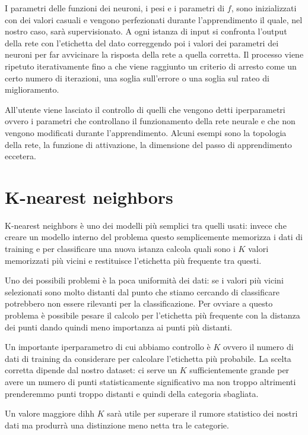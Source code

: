 \documentclass[a4paper,12pt]{report}
\begin{document}
I parametri delle funzioni dei neuroni, i pesi e i parametri di $f$, sono
inizializzati con dei valori casuali e vengono perfezionati durante
l'apprendimento il quale, nel nostro caso, sarà supervisionato. A ogni istanza
di input si confronta l'output della rete con l'etichetta del dato correggendo
poi i valori dei parametri dei neuroni per far avvicinare la risposta della rete
a quella corretta. Il processo viene ripetuto iterativamente fino a che viene
raggiunto un criterio di arresto come un certo numero di iterazioni, una soglia
sull'errore o una soglia sul rateo di miglioramento. 

All'utente viene lasciato il controllo di quelli che vengono detti iperparametri
ovvero i parametri che controllano il funzionamento della rete neurale e che non
vengono modificati durante l'apprendimento. Alcuni esempi sono la topologia
della rete, la funzione di attivazione, la dimensione del passo di apprendimento
eccetera.


\section{K-nearest neighbors}

K-nearest neighbors è uno dei modelli più semplici tra quelli usati: invece che
creare un modello interno del problema questo semplicemente memorizza i dati di
training e per classificare una nuova istanza calcola quali sono i $K$ valori
memorizzati più vicini e restituisce l'etichetta più frequente tra questi.

Uno dei possibili problemi è la poca uniformità dei dati: se i valori più vicini
selezionati sono molto distanti dal punto che stiamo cercando di classificare
potrebbero non essere rilevanti per la classificazione. Per ovviare a questo
problema è possibile pesare il calcolo per l'etichetta più frequente con la
distanza dei punti dando quindi meno importanza ai punti più distanti.

Un importante iperparametro di cui abbiamo controllo è $K$ ovvero il numero di
dati di training da considerare per calcolare l'etichetta più probabile. La
scelta corretta dipende dal nostro dataset: ci serve un $K$ sufficientemente
grande per avere un numero di punti statisticamente significativo ma non troppo
altrimenti prenderemmo punti troppo distanti e quindi della categoria sbagliata.


Un valore maggiore dihh
$K$ sarà utile per superare il rumore statistico dei nostri dati ma produrrà una
distinzione meno netta tra le categorie.
\end{document}
